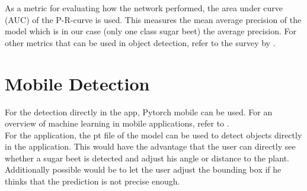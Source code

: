 As a metric for evaluating how the network performed, the area under curve (AUC) of the P-R-curve is used. This measures the mean average precision of the model which is in our case (only one class sugar beet) the average precision. For other metrics that can be used in object detection, refer to the survey by \cite{metrics_survey}.

\section{Mobile Detection}
For the detection directly in the app, Pytorch mobile \cite{pytorch_mobile} can be used. For an overview of machine learning in mobile applications, refer to \cite{survey_machine_learning_mobile}. \\

For the application, the pt file of the model can be used to detect objects directly in the application. This would have the advantage that the user can directly see whether a sugar beet is detected and adjust his angle or distance to the plant. Additionally possible would be to let the user adjust the bounding box if he thinks that the prediction is not precise enough. 


